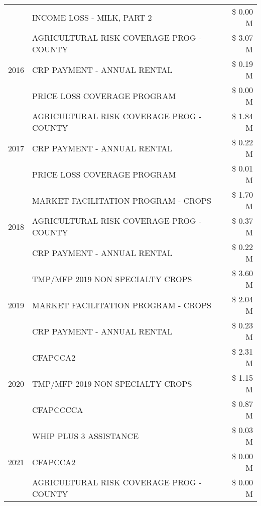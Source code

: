 \begin{tabular}{llr}
 & INCOME LOSS - MILK, PART 2 & \$ 0.00 M \\
\cline{1-3}
\multirow[t]{3}{*}{2016} & AGRICULTURAL RISK COVERAGE PROG - COUNTY      & \$ 3.07 M \\
 & CRP PAYMENT - ANNUAL RENTAL                   & \$ 0.19 M \\
 & PRICE LOSS COVERAGE PROGRAM                   & \$ 0.00 M \\
\cline{1-3}
\multirow[t]{3}{*}{2017} & AGRICULTURAL RISK COVERAGE PROG - COUNTY & \$ 1.84 M \\
 & CRP PAYMENT - ANNUAL RENTAL & \$ 0.22 M \\
 & PRICE LOSS COVERAGE PROGRAM & \$ 0.01 M \\
\cline{1-3}
\multirow[t]{3}{*}{2018} & MARKET FACILITATION PROGRAM - CROPS & \$ 1.70 M \\
 & AGRICULTURAL RISK COVERAGE PROG - COUNTY & \$ 0.37 M \\
 & CRP PAYMENT - ANNUAL RENTAL & \$ 0.22 M \\
\cline{1-3}
\multirow[t]{3}{*}{2019} & TMP/MFP 2019 NON SPECIALTY CROPS & \$ 3.60 M \\
 & MARKET FACILITATION PROGRAM - CROPS & \$ 2.04 M \\
 & CRP PAYMENT - ANNUAL RENTAL & \$ 0.23 M \\
\cline{1-3}
\multirow[t]{3}{*}{2020} & CFAPCCA2 & \$ 2.31 M \\
 & TMP/MFP 2019 NON SPECIALTY CROPS & \$ 1.15 M \\
 & CFAPCCCCA & \$ 0.87 M \\
\cline{1-3}
\multirow[t]{3}{*}{2021} & WHIP PLUS 3 ASSISTANCE & \$ 0.03 M \\
 & CFAPCCA2 & \$ 0.00 M \\
 & AGRICULTURAL RISK COVERAGE PROG - COUNTY & \$ 0.00 M \\
\cline{1-3}
\bottomrule
\end{tabular}
